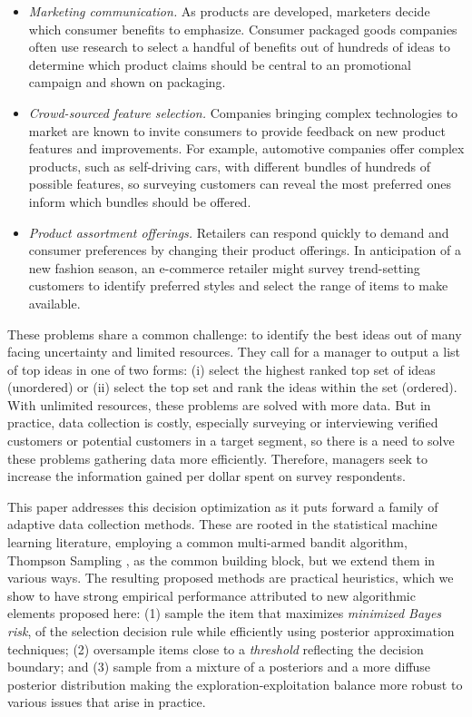 \documentclass[nonblindrev]{informs3}
\begin{document}
\begin{itemize}
	\item \emph{Marketing communication.} As products are developed, marketers decide which consumer benefits to emphasize. Consumer packaged goods companies often use research to select a handful of benefits out of hundreds of ideas to determine which product claims should be central to an promotional campaign and shown on packaging. 
	\item \emph{Crowd-sourced feature selection.} Companies bringing complex technologies to market are known to invite consumers to provide feedback on new product features and improvements. For example, automotive companies offer complex products, such as self-driving cars, with different bundles of hundreds of possible features, so surveying customers can reveal the most preferred ones inform which bundles should be offered.
	\item \emph{Product assortment offerings.} Retailers can respond quickly to demand and consumer preferences by changing their product offerings. In anticipation of a new fashion season, an e-commerce retailer might survey trend-setting customers to identify preferred styles and select the range of items to make available.
\end{itemize}

These problems share a common challenge: to identify the best ideas out of many facing uncertainty and limited resources. They call for a manager to output a list of top ideas in one of two forms: (i) select the highest ranked top set of ideas (unordered) or (ii) select the top set and rank the ideas within the set (ordered). With unlimited resources, these problems are solved with more data. But in practice, data collection is costly, especially surveying or interviewing verified customers or potential customers in a target segment, so there is a need to solve these problems gathering data more efficiently.  Therefore, managers seek to increase the information gained per dollar spent on survey respondents. 

This paper addresses this decision optimization as it puts forward a family of adaptive data collection methods. These are rooted in the statistical machine learning literature, employing a common multi-armed bandit algorithm, Thompson Sampling \citep{thompson1933likelihood}, as the common building block, but we extend them in various ways. The resulting proposed methods are practical heuristics, which we show to have strong empirical performance attributed to new algorithmic elements proposed here: (1) sample the item that maximizes \emph{minimized Bayes risk}, of the selection decision rule while efficiently using posterior approximation techniques; (2) oversample items close to a \emph{threshold} reflecting the decision boundary; and (3) sample from a mixture of a posteriors and a more diffuse posterior distribution making the exploration-exploitation balance more robust to various issues that arise in practice. 
\end{document}
